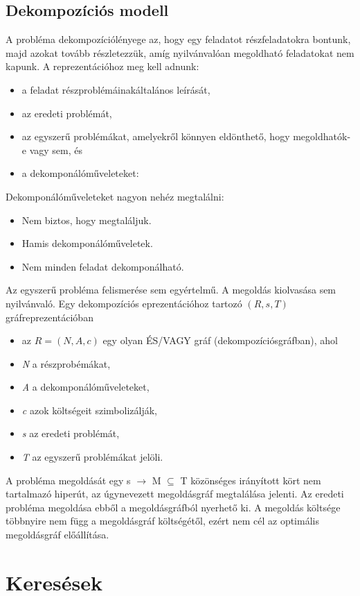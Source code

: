 \documentclass[margin=0px]{article}
\begin{document}
\subsection{Dekompozíciós modell}
A probléma dekompozíciólényege az, hogy egy feladatot részfeladatokra bontunk, majd azokat tovább részletezzük, amíg nyilvánvalóan megoldható feladatokat nem kapunk. A reprezentációhoz meg kell adnunk:
\begin{itemize}
    \item a feladat részproblémáinakáltalános leírását,
    \item az eredeti problémát,
    \item az egyszerű problémákat, amelyekről könnyen eldönthető, hogy megoldhatók-e vagy sem, és
    \item a dekomponálóműveleteket:
\end{itemize}
Dekomponálóműveleteket nagyon nehéz megtalálni:
\begin{itemize}
    \item Nem biztos, hogy megtaláljuk.
    \item Hamis dekomponálóműveletek.
    \item Nem minden feladat dekomponálható.
\end{itemize}
Az egyszerű probléma felismerése sem egyértelmű. A megoldás kiolvasása sem nyilvánvaló.
Egy dekompozíciós eprezentációhoz tartozó $( R, s, T )$ gráfreprezentációban
\begin{itemize}
    \item az $R = ( N, A, c )$ egy olyan ÉS/VAGY gráf (dekompozíciósgráfban), ahol
    \item {\it N} a részprobémákat,
    \item {\it A} a dekomponálóműveleteket,
    \item {\it c} azok költségeit szimbolizálják,
    \item {\it s} az eredeti problémát,
    \item {\it T} az egyszerű problémákat jelöli.
\end{itemize}

A probléma megoldását egy s $\rightarrow$ M $\subseteq$ T közönséges irányított kört nem tartalmazó hiperút, az úgynevezett megoldásgráf megtalálása jelenti. Az eredeti probléma megoldása ebből a megoldásgráfból nyerhető ki. A megoldás költsége többnyire nem függ a megoldásgráf költségétől, ezért nem cél az optimális megoldásgráf előállítása.

\section{Keresések}
\end{document}

